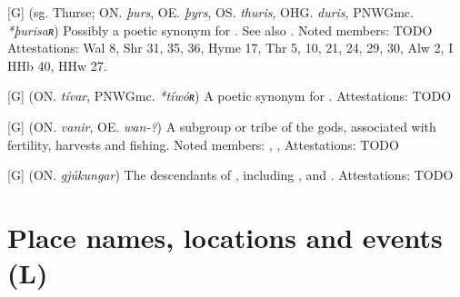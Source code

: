 \begin{itemize}
[G] (sg. Thurse; ON. \emph{þurs}, OE. \emph{þyrs}, OS. \emph{thuris}, OHG. \emph{duris}, PNWGmc. \emph{*þurisaʀ})
  Possibly a poetic synonym for . See also .
  Noted members: TODO
  Attestations: Wal 8, Shr 31, 35, 36, Hyme 17, Thr 5, 10, 21, 24, 29, 30, Alw 2, I HHb 40, HHw 27.

[G] (ON. \emph{tívar}, PNWGmc. \emph{*tíwóʀ})
  A poetic synonym for .
  Attestations: TODO

[G] (ON. \emph{vanir}, OE. \emph{wan-?})
  A subgroup or tribe of the gods, associated with fertility, harvests and fishing.
  Noted members: , , 
  Attestations: TODO

[G] (ON. \emph{gjúkungar})
  The descendants of , including ,  and .
  Attestations: TODO

\end{itemize}


\section{Place names, locations and events (L)}

